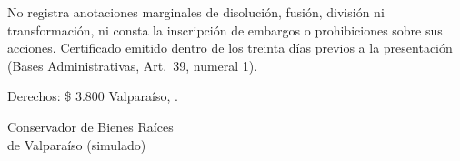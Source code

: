 \documentclass[11pt]{article}
\begin{document}
\vspace{6pt}
No registra anotaciones marginales de disolución, fusión, división ni transformación, ni consta la inscripción de embargos o prohibiciones sobre sus acciones. Certificado emitido dentro de los treinta días previos a la presentación (Bases Administrativas, Art.~39\textdegree, numeral 1).

\vspace{4pt}
Derechos: \$ 3.800 \hfill Valparaíso, \SIMfechacorta.

\vspace{10pt}
\noindent\begin{minipage}[b]{0.45\linewidth}\end{minipage}\hfill
\begin{minipage}[b]{0.45\linewidth}\raggedleft Conservador de Bienes Raíces\\de Valparaíso (simulado)\end{minipage}

\end{document}
